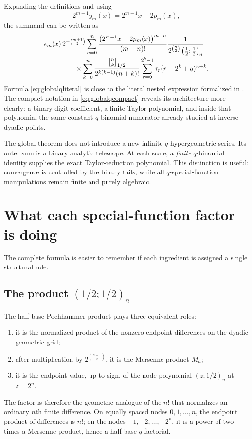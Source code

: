 \documentclass[11pt,oneside]{article}
\theoremstyle{definition}
\theoremstyle{remark}
\newcommand{\qpoch}[3]{\left(#1;#2\right)_{#3}}
\newcommand{\halfqbinom}[2]{{\genfrac{[}{]}{0pt}{}{#1}{#2}}_{1/2}}
\newcommand{\tm}{\tau}
\begin{document}
Expanding the definitions and using
\[
 2^{m+1}y_m(x)=2^{m+1}x-2p_m(x),
\]
the summand can be written as
\begin{align}
&\epsilon_m(x)\,2^{-\binom{m+1}{2}}
\sum_{n=0}^{m}
 \frac{\bigl(2^{m+1}x-2p_m(x)\bigr)^{m-n}}{(m-n)!}
 \frac{1}{2^{\binom n2}\qpoch{\frac12}{\frac12}{n}}
 \notag\\[-0.2em]
&\hspace{4.5em}\times
 \sum_{k=0}^{n}
 \frac{\halfqbinom{n}{k}}
      {2^{k(k-1)}(n+k)!}
 \sum_{r=0}^{2^k-1}
 \tm_r(r-2^k+q)^{n+k}.
 \label{eq:globalqliteral}
\end{align}
Formula \eqref{eq:globalqliteral} is close to the literal nested expression
formalized in .  The compact
notation in \eqref{eq:globalqcompact} reveals its architecture more clearly:
a binary digit coefficient, a finite Taylor polynomial, and inside that
polynomial the same constant $q$-binomial numerator already studied at
inverse dyadic points.

\begin{keybox}
The global theorem does not introduce a new infinite $q$-hypergeometric
series.  Its outer sum is a binary analytic telescope.  At each scale, a
\emph{finite} $q$-binomial identity supplies the exact Taylor-reduction
polynomial.  This distinction is useful: convergence is controlled by the
binary tails, while all $q$-special-function manipulations remain finite and
purely algebraic.
\end{keybox}

\section{What each special-function factor is doing}

The complete formula is easier to remember if each ingredient is assigned a
single structural role.

\subsection{The product \texorpdfstring{$\qpoch{1/2}{1/2}{n}$}{(1/2;1/2)[n]}}

The half-base Pochhammer product plays three equivalent roles:
\begin{enumerate}[leftmargin=2.2em]
\item it is the normalized product of the nonzero endpoint differences on
the dyadic geometric grid;
\item after multiplication by $2^{\binom{n+1}{2}}$, it is the Mersenne
product $M_n$;
\item it is the endpoint value, up to sign, of the node polynomial
$\qpoch{z}{1/2}{n}$ at $z=2^n$.
\end{enumerate}
The factor is therefore the geometric analogue of the $n!$ that normalizes
an ordinary $n$th finite difference.  On equally spaced nodes
$0,1,\ldots,n$, the endpoint product of differences is $n!$; on the nodes
$-1,-2,\ldots,-2^n$, it is a power of two times a Mersenne product, hence a
half-base $q$-factorial.
\end{document}
